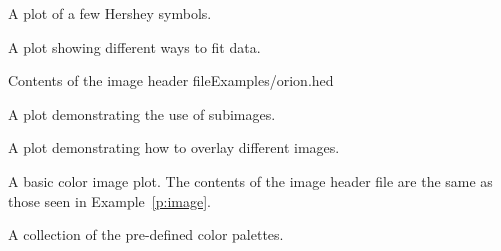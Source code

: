 \clearpage
{}%
{A plot of a few Hershey symbols.}{}{}

\clearpage
{}%
{A plot showing different ways to fit data.}{}{}

\clearpage
{}%
{Contents of the image header file}{Examples/orion.hed}

\clearpage
{}%
{A plot demonstrating the use of subimages.}{}{}

\clearpage
{}%
{A plot demonstrating how to overlay different images.}{}{}

\begin{htmlonly}
\clearpage
{}%
{A basic color image plot.  The contents of the image
header file are the same as those seen in Example~\ref{p:image}.}{}{}

\clearpage
{}%
{A collection of the pre-defined color palettes.}{}{}
\end{htmlonly}
